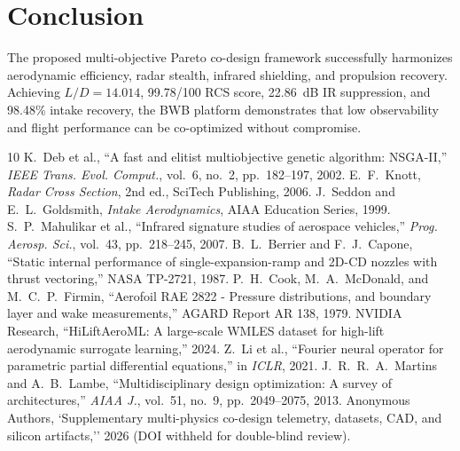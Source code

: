 \documentclass[journal,10pt,twocolumn]{IEEEtran}
\begin{document}
\section{Conclusion}
The proposed multi-objective Pareto co-design framework successfully harmonizes aerodynamic efficiency, radar stealth, infrared shielding, and propulsion recovery. Achieving $L/D = 14.014$, 99.78/100 RCS score, 22.86~dB IR suppression, and 98.48\% intake recovery, the BWB platform demonstrates that low observability and flight performance can be co-optimized without compromise.

\begin{thebibliography}{10}
 K.~Deb et al., ``A fast and elitist multiobjective genetic algorithm: NSGA-II,'' \emph{IEEE Trans. Evol. Comput.}, vol.~6, no.~2, pp.~182--197, 2002.
 E.~F.~Knott, \emph{Radar Cross Section}, 2nd ed., SciTech Publishing, 2006.
 J.~Seddon and E.~L.~Goldsmith, \emph{Intake Aerodynamics}, AIAA Education Series, 1999.
 S.~P.~Mahulikar et al., ``Infrared signature studies of aerospace vehicles,'' \emph{Prog. Aerosp. Sci.}, vol.~43, pp.~218--245, 2007.
 B.~L.~Berrier and F.~J.~Capone, ``Static internal performance of single-expansion-ramp and 2D-CD nozzles with thrust vectoring,'' NASA TP-2721, 1987.
 P.~H.~Cook, M.~A.~McDonald, and M.~C.~P.~Firmin, ``Aerofoil RAE 2822 - Pressure distributions, and boundary layer and wake measurements,'' AGARD Report AR 138, 1979.
 NVIDIA Research, ``HiLiftAeroML: A large-scale WMLES dataset for high-lift aerodynamic surrogate learning,'' 2024.
 Z.~Li et al., ``Fourier neural operator for parametric partial differential equations,'' in \emph{ICLR}, 2021.
 J.~R.~R.~A.~Martins and A.~B.~Lambe, ``Multidisciplinary design optimization: A survey of architectures,'' \emph{AIAA J.}, vol.~51, no.~9, pp.~2049--2075, 2013.
 Anonymous Authors, `Supplementary multi-physics co-design telemetry, datasets, CAD, and silicon artifacts,'' 2026 (DOI withheld for double-blind review).
\end{thebibliography}
\end{document}
